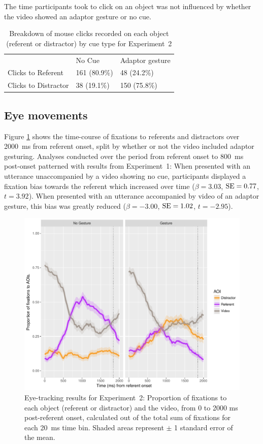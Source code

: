 \documentclass[a4paper,man,natbib]{apa6}
\newcommand{\resultsLM}[3]{$\beta = #1$, $\textnormal{SE} = #2$, $t #3$}
\begin{document}
The time participants took to click on an object was not influenced by whether the video showed an adaptor gesture or no cue.

\begin{table}
\caption{Breakdown of mouse clicks recorded on each object (referent or distractor) by cue type for Experiment~2}
\label{table:v2_clicks}
\begin{tabularx}{\linewidth}{YYY}
\hline
& No Cue & Adaptor gesture \\
Clicks to Referent & 161 (80.9\%) & 48 (24.2\%)  \\
Clicks to Distractor & 38 (19.1\%) & 150 (75.8\%)  \\
\hline
\end{tabularx}
\end{table}


\subsection{Eye movements}
Figure \ref{fig:v2_eye} shows the time-course of fixations to referents and distractors over 2000~ms from referent onset, split by whether or not the video included adaptor gesturing.
Analyses conducted over the period from referent onset to 800~ms post-onset patterned with results from Experiment~1: 
When presented with an utterance unaccompanied by a video showing no cue, participants displayed a fixation bias towards the referent which increased over time (\resultsLM{3.03}{0.77}{=3.92}).
When presented with an utterance accompanied by video of an adaptor gesture, this bias was greatly reduced (\resultsLM{-3.00}{1.02}{=-2.95}).

\begin{figure}[Ht]
  \centering
	\includegraphics[width=\linewidth]{./img/e8_fixations.pdf}
  \caption{Eye-tracking results for Experiment~2: Proportion of fixations to each object (referent or distractor) and the video, from 0 to 2000 ms post-referent onset, calculated out of the total sum of fixations for each 20~ms time bin. Shaded areas represent $\pm$ 1 standard error of the mean.}
  \label{fig:v2_eye}
\end{figure}
\end{document}
